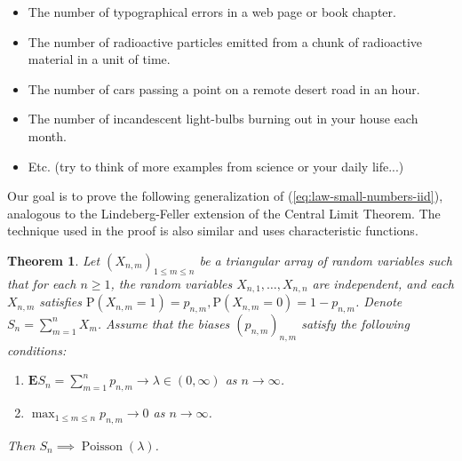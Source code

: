 \documentclass[11pt]{report}
\theoremstyle{plain}
\newtheorem{thm}{Theorem}[chapter]
\theoremstyle{definition}
\begin{document}
\begin{itemize}
\item The number of typographical errors in a web page or
book chapter.

\item The number of radioactive particles emitted from a
chunk of radioactive material in a unit of time.

\item The number of cars passing a point on a remote desert
road in an hour.

\item The number of incandescent light-bulbs burning out in
your house each month.

\item Etc. (try to think of more examples from science or
your daily life...)
\end{itemize}

Our goal is to prove the following generalization of
(\ref{eq:law-small-numbers-iid}), analogous to the
Lindeberg-Feller extension of the Central Limit
Theorem. The technique used in the proof is also
similar and uses characteristic functions.

\begin{thm}
Let $(X_{n,m})_{1\le m\le n}$ be a triangular array
of random variables such that for each $n\ge1$, the
random variables $X_{n,1},\ldots,X_{n,n}$ are
independent, and each $X_{n,m}$ satisfies
$\mathrm{P}(X_{n,m}=1)=p_{n,m},
\mathrm{P}(X_{n,m}=0)=1-p_{n,m}$.
Denote $S_n=\sum_{m=1}^n X_m$. Assume that the biases
$(p_{n,m})_{n,m}$ satisfy the following conditions:

\begin{enumerate}[label=(\roman*)]
\item $\mathbf{E} S_n = \sum_{m=1}^n p_{n,m} \to
\lambda\in(0,\infty)$
as $n\to\infty$.

\item $\max_{1\le m\le n} p_{n,m} \to 0$ as $n\to\infty$.
\end{enumerate}

Then $S_n \implies \operatorname{Poisson}(\lambda)$.
\end{thm}
\end{document}
